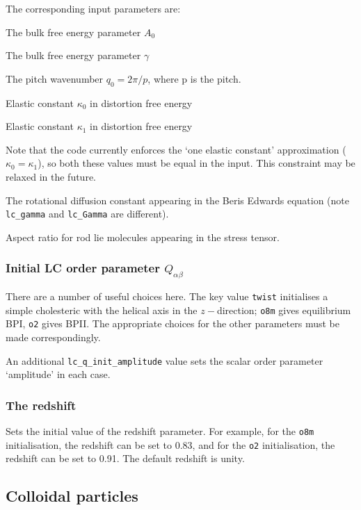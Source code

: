 The corresponding input parameters are:

 The bulk free energy parameter $A_0$

 The bulk free energy parameter $\gamma$

 The pitch wavenumber $q_0 = 2\pi / p$, where p
is the pitch.

 Elastic constant $\kappa_0$ in distortion free energy

 Elastic constant $\kappa_1$ in distortion free energy

Note that the code currently enforces the `one elastic constant'
approximation ($\kappa_0 = \kappa_1$), so both these values must
be equal in the input. This constraint may be relaxed in the future.


 The rotational diffusion constant appearing in
the Beris Edwards equation (note \texttt{lc\_gamma} and \texttt{lc\_Gamma}
are different).

 Aspect ratio for rod lie molecules appearing in the
stress tensor.


\subsubsection{Initial LC order parameter $Q_{\alpha\beta}$}


There are a number of useful choices here. The key value
\texttt{twist} initialises a simple cholesteric with the
helical axis in the $z-$direction;  \texttt{o8m}
gives equilibrium BPI, \texttt{o2} gives BPII. The appropriate
choices for the other parameters must be made correspondingly.

An additional \texttt{lc\_q\_init\_amplitude} value sets the
scalar order parameter  `amplitude' in each case.

\subsubsection{The redshift}


Sets the initial value of the redshift parameter. For example,
for the \texttt{o8m} initialisation, the redshift can be set to 0.83,
and for the \texttt{o2} initialisation, the redshift can be set to 0.91.
The default redshift is unity.

\subsection{Colloidal particles}

